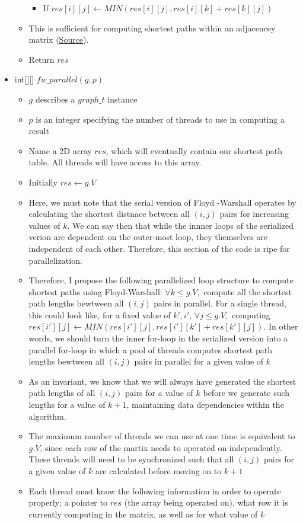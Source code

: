 \documentclass[]{article}
\begin{document}
\begin{itemize}
\begin{itemize}
			\begin{itemize}
				\item If $res[i][j] \leftarrow MIN(res[i][j], res[i][k] +res[k][j])$ 
			\end{itemize}
			\item This is sufficient for computing shortest paths within an adjacencey matrix (\href{https://en.wikipedia.org/wiki/Floyd%E2%80%93Warshall_algorithm}{Source}).
				\item Return $res$
			\end{itemize}
			\item int[][] $fw\_parallel(g, p)$
			\begin{itemize}
				\item $g$ describes a $graph\_t$ instance
				\item $p$ is an integer specifying the number of threads to use in computing a result
				\item Name a 2D array $res$, which will  eventually contain our shortest path table. All threads will have access to this array.
				\item Initially $res \leftarrow g.V$
				\item Here, we must note that the serial version of Floyd -Warshall operates by calculating the shortest distnace between all $(i, j)$ pairs for increasing values of $k$. We can say then that while the innner loops of the serialized verion are dependent on the outer-most loop, they themselves are independent of each other. Therefore, this section of the code is ripe for parallelization.
				\item Therefore, I propose the following parallelized loop structure to compute shortest paths using Floyd-Warshall: $\forall k \leq g.V,$ compute all the shortest path lengths bewtween all $(i, j)$ pairs in parallel. For a single thread, this could look like, for a fixed value of $k', i'$, $\forall j \leq g.V,$ computing $res[i'][j] \leftarrow MIN(res[i'][j], res[i'][k'] +res[k'][j])$. In other words, we should turn the inner for-loop in the serialized version into a parallel for-loop in which a pool of threads computes shortest path lengths bewtween all $(i, j)$ pairs in parallel for a given value of $k$
				\item As an invariant, we know that we will always have generated the shortest path lengths of all $(i,j)$ pairs for a value of $k$ before we generate such lengths for a value of $k + 1$, maintaining data dependencies within the algorithm.
				\item The maximum number of threads we can use at one time is equivalent to $g.V$, since each row of the martix needs to operated on independently. These threads will need to be synchronized such that all $(i,j)$ pairs for a given value of $k$ are calculated before moving on to $k + 1$
				\item Each thread must know the following information in order to operate properly; a pointer to $res$ (the array being operated on), what row it is currently computing in the matrix, as well as for what value of $k$
			\end{itemize}
		\end{itemize}
		
\end{document}
